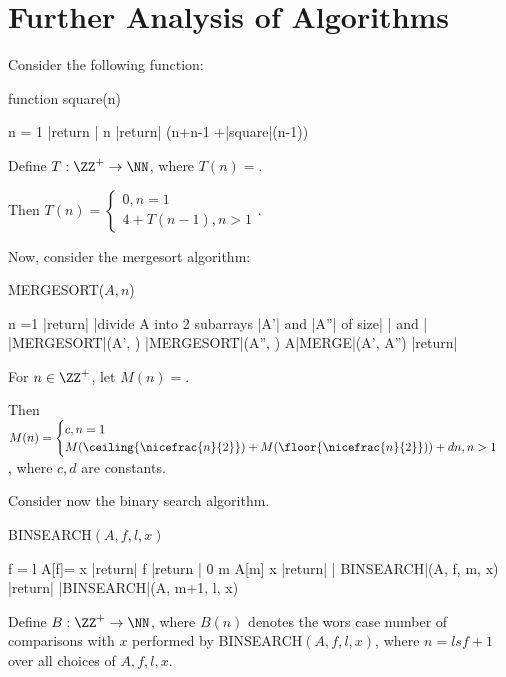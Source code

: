 \documentclass[11pt]{scrartcl}
\begin{document}
\section{Further Analysis of Algorithms}
Consider the following function:

function square(n)

\begin{program}
  \IF n = 1
  \THEN |return | n
  \ELSE |return| (n+n-1 +|square|(n-1))
  \FI
\end{program}

Define $T:\ZZ^+\to \NN$, where $T(n)=$.

Then $T(n) = \begin{cases}
  0, n =1\\
  4+T(n-1) , n > 1
\end{cases}$.

Now, consider the mergesort algorithm:

MERGESORT($A, n$)
\begin{program}
  \IF n =1 \THEN |return|
  |divide A into 2 subarrays |A'| and |A''| of size| | and |
  |MERGESORT|(A', )
  |MERGESORT|(A'', )
  \FI
  A\gets |MERGE|(A', A'')
  |return|
\end{program}

For $n\in\ZZ^{+}$, let $M(n)=$.

Then $M(n) = \begin{cases}
  c, n = 1\\
  M(\ceiling{\nicefrac{n}{2}}) + M(\floor{\nicefrac{n}{2}}))+dn, n > 1
\end{cases}$, where $c, d$ are constants.

Consider now the binary search algorithm.

BINSEARCH$(A, f, l, x)$

\begin{program}
  \IF f = l \THEN
  \IF A[f]= x \THEN |return| f
  \ELSE |return | 0
  \FI
  \FI
  m \gets {}
  \IF A[m] \geq x \THEN
  |return| | BINSEARCH|(A, f, m, x)
  \ELSE |return| |BINSEARCH|(A, m+1, l, x)
\end{program}


Define $B:\ZZ^+\to \NN$, where $B(n)$ denotes the wors case number of
comparisons with $x$ performed by BINSEARCH$(A, f, l, x)$, where $n = l s f +1$ over all choices of $A, f, l, x$.
\end{document}
